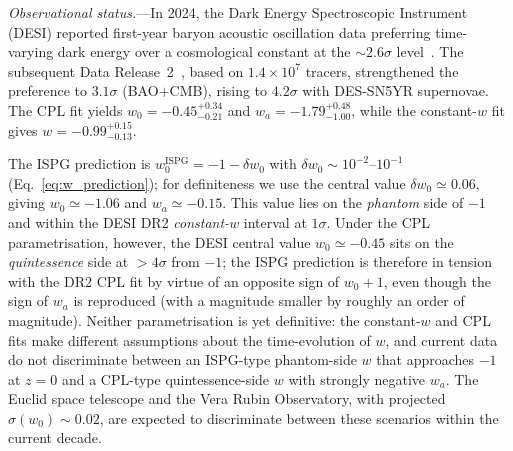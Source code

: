 \documentclass[aps,prd,onecolumn,superscriptaddress,nofootinbib,showpacs,12pt,notitlepage]{revtex4-2}
\begin{document}
\textit{Observational status.}---In 2024, the Dark Energy
Spectroscopic Instrument (DESI) reported first-year
baryon acoustic oscillation data preferring time-varying
dark energy over a cosmological constant at the
$\sim 2.6\sigma$ level~\cite{DESI2024}.  The subsequent
Data Release~2~\cite{DESIDR2}, based on $1.4\times 10^7$ tracers,
strengthened the preference to $3.1\sigma$ (BAO$+$CMB),
rising to $4.2\sigma$ with DES-SN5YR supernovae.
The CPL fit
yields $w_0 = -0.45^{+0.34}_{-0.21}$ and
$w_a = -1.79^{+0.48}_{-1.00}$, while the constant-$w$
fit gives $w = -0.99^{+0.15}_{-0.13}$.

The ISPG prediction is $w_{0}^{\mathrm{ISPG}}
= -1 - \delta w_0$ with $\delta w_0 \sim 10^{-2}$--$10^{-1}$
(Eq.~\ref{eq:w_prediction}); for definiteness we use
the central value $\delta w_0 \simeq 0.06$, giving
$w_0 \simeq -1.06$ and $w_a \simeq -0.15$.  This value
lies on the \emph{phantom} side of $-1$ and within the
DESI DR2 \emph{constant-$w$} interval at $1\sigma$.  Under
the CPL parametrisation, however, the DESI central value
$w_0 \simeq -0.45$ sits on the \emph{quintessence} side
at $>4\sigma$ from $-1$; the ISPG prediction is therefore
in tension with the DR2 CPL fit by virtue of an opposite
sign of $w_0 + 1$, even though the sign of $w_a$ is
reproduced (with a magnitude smaller by roughly an
order of magnitude).  Neither parametrisation is yet
definitive: the constant-$w$ and CPL fits make different
assumptions about the time-evolution of $w$, and current
data do not discriminate between an ISPG-type
phantom-side $w$ that approaches $-1$ at $z=0$ and a
CPL-type quintessence-side $w$ with strongly negative
$w_a$.  The Euclid space telescope and the Vera Rubin
Observatory, with projected $\sigma(w_0) \sim 0.02$,
are expected to discriminate between these scenarios
within the current decade.
\end{document}
